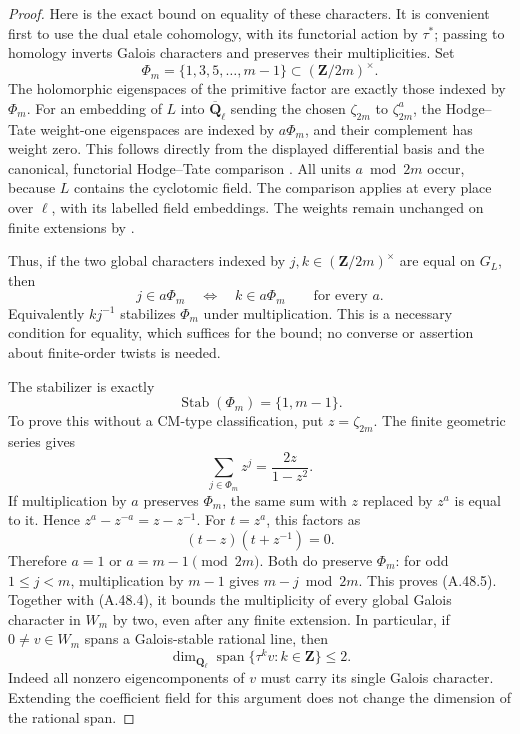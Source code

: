 \begin{proof}
Here is the exact bound on equality of these
characters. It is convenient first to use the dual
etale cohomology, with its functorial action by
\(\tau^*\); passing to homology inverts Galois
characters and preserves their multiplicities.
Set
\[
 \Phi_m=\{1,3,5,\ldots,m-1\}
                \subset(\mathbf Z/2m)^\times.       \tag{A.48.3}
\]
The holomorphic eigenspaces of the primitive factor
are exactly those indexed by \(\Phi_m\).
For an embedding of \(L\) into
\(\overline{\mathbf Q}_\ell\) sending the chosen
\(\zeta_{2m}\) to \(\zeta_{2m}^a\), the
Hodge--Tate weight-one eigenspaces are indexed by
\(a\Phi_m\), and their complement has weight zero.
This follows directly from the displayed differential
basis and the canonical, functorial Hodge--Tate
comparison
\cite[Theorem 2.2.3, printed p.13]{fghBrinonConrad}.
All units \(a\bmod 2m\) occur, because \(L\)
contains the cyclotomic field. The comparison applies
at every place over \(\ell\), with its labelled
field embeddings. The weights remain unchanged on
finite extensions by
\cite[Theorem 2.4.6, printed p.20]{fghBrinonConrad}.

Thus, if the two global characters indexed by
\(j,k\in(\mathbf Z/2m)^\times\) are equal on
\(G_L\), then
\[
       j\in a\Phi_m\quad\Longleftrightarrow\quad
       k\in a\Phi_m\qquad\text{for every }a.
                                                               \tag{A.48.4}
\]
Equivalently \(kj^{-1}\) stabilizes \(\Phi_m\)
under multiplication. This is a necessary condition
for equality, which suffices for the bound; no
converse or assertion about finite-order twists is
needed.

The stabilizer is exactly
\[
       \operatorname{Stab}(\Phi_m)=\{1,m-1\}.       \tag{A.48.5}
\]
To prove this without a CM-type classification, put
\(z=\zeta_{2m}\). The finite geometric series gives
\[
               \sum_{j\in\Phi_m}z^j
                         =\frac{2z}{1-z^2}.
\]
If multiplication by \(a\) preserves \(\Phi_m\),
the same sum with \(z\) replaced by \(z^a\)
is equal to it. Hence
\(z^a-z^{-a}=z-z^{-1}\). For \(t=z^a\),
this factors as
\[
                         (t-z)(t+z^{-1})=0.
\]
Therefore \(a=1\) or \(a=m-1\pmod{2m}\).
Both do preserve \(\Phi_m\): for odd
\(1\le j<m\), multiplication by \(m-1\)
gives \(m-j\bmod 2m\). This proves (A.48.5).
Together with (A.48.4), it bounds the multiplicity
of every global Galois character in \(W_m\) by two,
even after any finite extension. In particular, if
\(0\ne v\in W_m\) spans a Galois-stable rational
line, then
\[
          \dim_{\mathbf Q_\ell}
              \operatorname{span}\{\tau^k v:k\in\mathbf Z\}
                              \le2.                \tag{A.48.6}
\]
Indeed all nonzero eigencomponents of \(v\) must
carry its single Galois character. Extending the
coefficient field for this argument does not change
the dimension of the rational span.


\end{proof}
